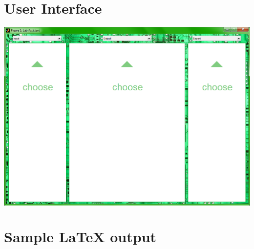 \documentclass[twocolumn]{article}
\begin{document}
\section{User Interface}
\label{ui}
\begin{center}
\includegraphics[width=16cm]{Figure/startup.png}
\end{center}
\clearpage
\section{Sample LaTeX output}
\label{output}

\end{document}
